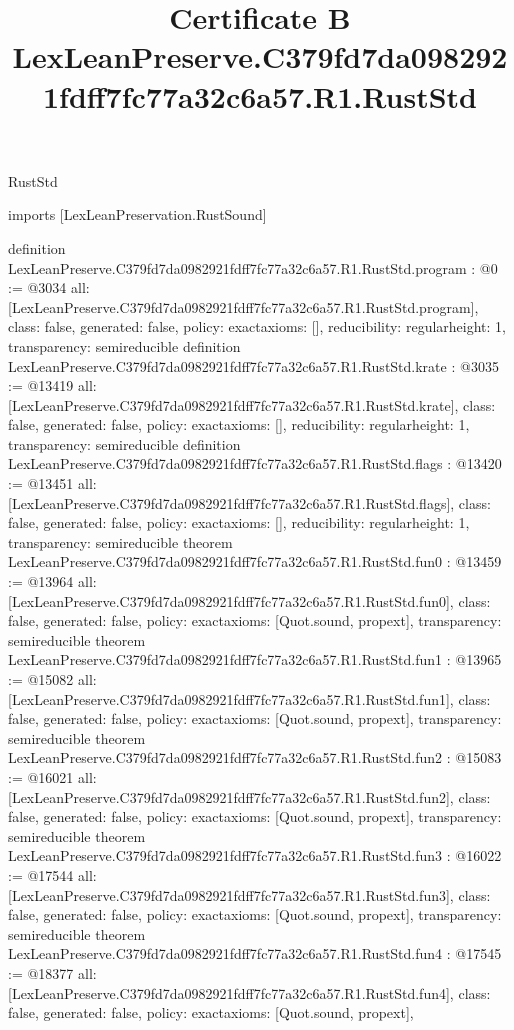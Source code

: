 \begin{lexlean}{RustStd}
\title{Certificate B LexLeanPreserve.C379fd7da0982921fdff7fc77a32c6a57.R1.RustStd}
\begin{coremodule}
imports [LexLeanPreservation.RustSound]

definition LexLeanPreserve.C379fd7da0982921fdff7fc77a32c6a57.R1.RustStd.program : @0 := @3034 {
  all: [LexLeanPreserve.C379fd7da0982921fdff7fc77a32c6a57.R1.RustStd.program],
  class: false,
  generated: false,
  policy: exact{axioms: []},
  reducibility: regular{height: 1},
  transparency: semireducible
}
definition LexLeanPreserve.C379fd7da0982921fdff7fc77a32c6a57.R1.RustStd.krate : @3035 := @13419 {
  all: [LexLeanPreserve.C379fd7da0982921fdff7fc77a32c6a57.R1.RustStd.krate],
  class: false,
  generated: false,
  policy: exact{axioms: []},
  reducibility: regular{height: 1},
  transparency: semireducible
}
definition LexLeanPreserve.C379fd7da0982921fdff7fc77a32c6a57.R1.RustStd.flags : @13420 := @13451 {
  all: [LexLeanPreserve.C379fd7da0982921fdff7fc77a32c6a57.R1.RustStd.flags],
  class: false,
  generated: false,
  policy: exact{axioms: []},
  reducibility: regular{height: 1},
  transparency: semireducible
}
theorem LexLeanPreserve.C379fd7da0982921fdff7fc77a32c6a57.R1.RustStd.fun0 : @13459 := @13964 {
  all: [LexLeanPreserve.C379fd7da0982921fdff7fc77a32c6a57.R1.RustStd.fun0],
  class: false,
  generated: false,
  policy: exact{axioms: [Quot.sound, propext]},
  transparency: semireducible
}
theorem LexLeanPreserve.C379fd7da0982921fdff7fc77a32c6a57.R1.RustStd.fun1 : @13965 := @15082 {
  all: [LexLeanPreserve.C379fd7da0982921fdff7fc77a32c6a57.R1.RustStd.fun1],
  class: false,
  generated: false,
  policy: exact{axioms: [Quot.sound, propext]},
  transparency: semireducible
}
theorem LexLeanPreserve.C379fd7da0982921fdff7fc77a32c6a57.R1.RustStd.fun2 : @15083 := @16021 {
  all: [LexLeanPreserve.C379fd7da0982921fdff7fc77a32c6a57.R1.RustStd.fun2],
  class: false,
  generated: false,
  policy: exact{axioms: [Quot.sound, propext]},
  transparency: semireducible
}
theorem LexLeanPreserve.C379fd7da0982921fdff7fc77a32c6a57.R1.RustStd.fun3 : @16022 := @17544 {
  all: [LexLeanPreserve.C379fd7da0982921fdff7fc77a32c6a57.R1.RustStd.fun3],
  class: false,
  generated: false,
  policy: exact{axioms: [Quot.sound, propext]},
  transparency: semireducible
}
theorem LexLeanPreserve.C379fd7da0982921fdff7fc77a32c6a57.R1.RustStd.fun4 : @17545 := @18377 {
  all: [LexLeanPreserve.C379fd7da0982921fdff7fc77a32c6a57.R1.RustStd.fun4],
  class: false,
  generated: false,
  policy: exact{axioms: [Quot.sound, propext]},
}
\end{coremodule}
\end{lexlean}
